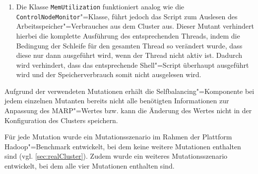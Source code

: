 \begin{enumerate}
    \item
    Die Klasse \texttt{MemUtilization} funktioniert analog wie die \texttt{ControlNodeMonitor}"=Klasse, führt jedoch das Script zum Auslesen des Arbeitsspeicher"=Verbrauches aus dem Cluster aus.
    Dieser Mutant verhindert hierbei die komplette Ausführung des entsprechenden Threads, indem die Bedingung der Schleife für den gesamten Thread so verändert wurde, dass diese nur dann ausgeführt wird, wenn der Thread nicht aktiv ist.
    Dadurch wird verhindert, dass das entsprechende Shell"=Script überhaupt ausgeführt wird und der Speicherverbrauch somit nicht ausgelesen wird.
\end{enumerate}

Aufgrund der verwendeten Mutationen erhält die Selfbalancing"=Komponente bei jedem einzelnen Mutanten bereits nicht alle benötigten Informationen zur Anpassung des \ac{MARP}"=Wertes bzw. kann die Änderung des Wertes nicht in der Konfiguration des Clusters speichern.

Für jede Mutation wurde ein Mutationsszenario im Rahmen der Plattform Hadoop"=Benchmark entwickelt, bei dem keine weitere Mutationen enthalten sind (vgl. \autoref{sec:realCluster}).
Zudem wurde ein weiteres Mutationsszenario entwickelt, bei dem alle vier Mutationen enthalten sind.
